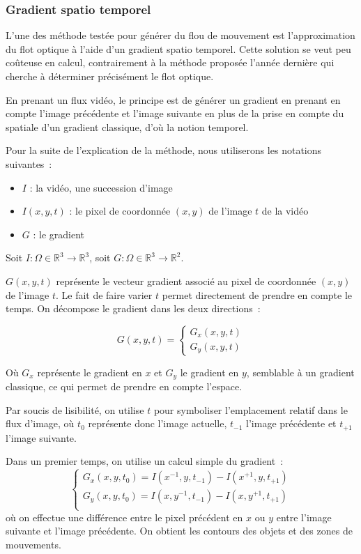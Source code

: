 \documentclass[fleqn,10pt]{SelfArx} %
\begin{document}
%
\subsubsection{Gradient spatio temporel}
L'une des méthode testée pour générer du flou de mouvement est l'approximation du flot optique à l'aide
d'un gradient spatio temporel.
Cette solution se veut peu coûteuse en calcul, contrairement à la méthode proposée l'année
dernière\cite{hfr2lfr2015} qui cherche à déterminer précisément le flot optique.

En prenant un flux vidéo, le principe est de générer un gradient en prenant en compte l'image précédente et
l'image suivante en plus de la prise en compte du spatiale d'un gradient classique, d'où la notion temporel.

Pour la suite de l'explication de la méthode, nous utiliserons les notations suivantes~:
\begin{itemize}
    \item $I$ : la vidéo, une succession d'image
    \item $I(x, y, t)$ : le pixel de coordonnée $(x, y)$ de l'image $t$ de la vidéo
    \item $G$ : le gradient
\end{itemize}
Soit $ I : \Omega \in \mathbb{R}^{3} \to \mathbb{R}^{3} $,
soit $ G : \Omega \in \mathbb{R}^{3} \to \mathbb{R}^{2} $.

$G(x, y, t)$ représente le vecteur gradient associé au pixel de coordonnée $(x, y)$ de l'image $t$.
Le fait de faire varier $t$ permet directement de prendre en compte le temps.
On décompose le gradient dans les deux directions~:

\[G(x,y,t) = 
    \begin{cases}
        G_{x}(x,y,t) \\
        G_{y}(x,y,t)
    \end{cases}
\]

Où $G_{x}$ représente le gradient en $x$ et $G_{y}$ le gradient en $y$, semblable à un gradient classique, 
ce qui permet de prendre en compte l'espace.

Par soucis de lisibilité, on utilise $t$ pour symboliser l'emplacement relatif dans le flux d'image, où $t_{0}$ représente donc
l'image actuelle, $t_{-1}$ l'image précédente et $t_{+1}$ l'image suivante.

Dans un premier temps, on utilise un calcul simple du gradient~:
\[
    \begin{cases}
        G_{x}(x,y,t_{0}) = I(x^{-1}, y, t_{-1}) - I(x^{+1}, y, t_{+1}) \\
        G_{y}(x,y,t_{0}) = I(x, y^{-1}, t_{-1}) - I(x, y^{+1}, t_{+1}) \\
    \end{cases}
\]
où on effectue une différence entre le pixel précédent en $x$ ou $y$ entre l'image suivante et l'image
précédente. On obtient les contours des objets et des zones de mouvements.
\end{document}
